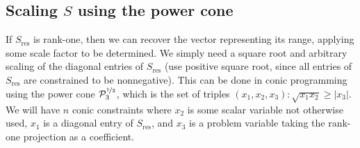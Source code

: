 \documentclass{article}
\begin{document}







\subsection{Scaling $S$ using the power cone}

If $S_\text{res}$ is rank-one, then we can recover the vector representing its range, applying some scale factor to be determined. We simply need a square root and arbitrary scaling of the diagonal entries of $S_\text{res}$ (use positive square root, since all entries of $S_\text{res}$ are constrained to be nonnegative). This can be done in conic programming using the power cone $\mathcal{P}_3^{\nicefrac{1}{2}}$, which is the set of triples $(x_1,x_2,x_3) : \sqrt{x_1x_2} \ge |x_3|$. We will have $n$ conic constraints where $x_2$ is some scalar variable not otherwise used, $x_1$ is a diagonal entry of $S_\text{res}$, and $x_3$ is a problem variable taking the rank-one projection as a coefficient.
\end{document}
